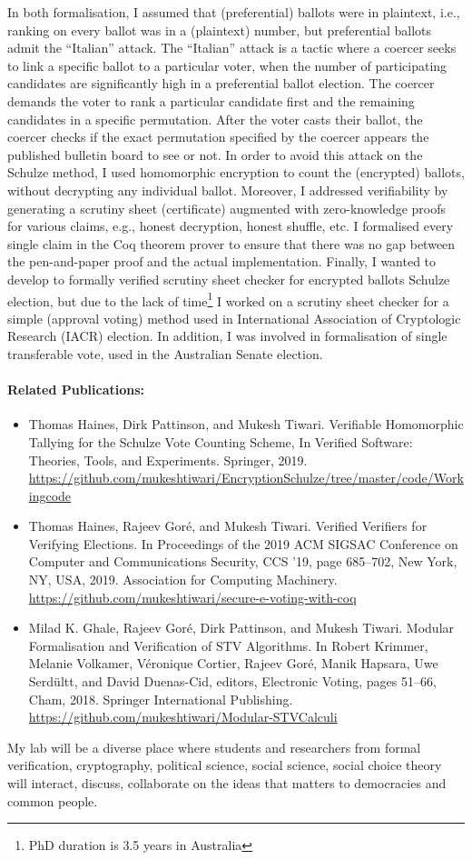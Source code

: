 \documentclass[a4paper]{article}
\begin{document}
In both formalisation, I assumed that (preferential) ballots were in plaintext, i.e., 
ranking on every ballot was in a (plaintext) number, but preferential ballots 
admit the ``Italian'' attack. The ``Italian'' attack is a tactic where a coercer 
seeks to link a specific ballot 
to a particular voter, when the number of participating candidates 
are significantly high in a preferential ballot election. 
The coercer demands the voter to rank a particular 
candidate first and the remaining candidates in a specific permutation. After the 
voter casts their ballot, the coercer checks if 
the exact permutation specified by the coercer appears the published bulletin board to see or not.
In order to
avoid this attack on the Schulze method, I used homomorphic encryption to count the (encrypted) 
ballots, without decrypting any individual ballot. Moreover, I addressed verifiability
by generating a scrutiny sheet (certificate) augmented with zero-knowledge proofs for 
various claims, e.g., honest decryption, honest shuffle, etc. 
I formalised every single 
claim in the Coq theorem prover to ensure that there was no gap between 
the pen-and-paper proof and the actual implementation. 
Finally, I wanted to develop to formally 
verified scrutiny sheet checker for encrypted ballots Schulze election, but due to the lack of 
time\footnote{PhD duration is 3.5 years in Australia} I worked on a scrutiny sheet checker for a 
simple (approval voting) method used in
International Association of Cryptologic Research (IACR) election.
In addition, I was involved in formalisation of single transferable vote, used in 
the Australian Senate election.

\paragraph{Related Publications:}
\begin{itemize}
    \item {Thomas Haines, Dirk Pattinson, and Mukesh Tiwari.} 
    {Verifiable Homomorphic Tallying for the Schulze Vote Counting Scheme, 
    In Verified Software: Theories, Tools, and Experiments. Springer, 2019.}
    {\url{https://github.com/mukeshtiwari/EncryptionSchulze/tree/master/code/Workingcode}}
    \item  {Thomas Haines, Rajeev Gor{\'e}, and Mukesh Tiwari. 
    Verified Verifiers for Verifying Elections. In Proceedings of the 2019 ACM SIGSAC Conference on 
    Computer and Communications Security, CCS '19, page 685--702, New York, NY, 
    USA, 2019. Association for Computing Machinery.}
    {\url{https://github.com/mukeshtiwari/secure-e-voting-with-coq}}
    \item {Milad K. Ghale, Rajeev Gor{\'e}, Dirk Pattinson, and Mukesh Tiwari.
    Modular Formalisation and Verification of STV Algorithms. In Robert Krimmer, Melanie Volkamer, 
    V{\'e}ronique Cortier, 
    Rajeev Gor{\'e}, Manik Hapsara, Uwe Serd{\"u}ltt, and David Duenas-Cid, editors, 
    Electronic Voting, pages 51--66, Cham, 2018. Springer International Publishing.}
    {\url{https://github.com/mukeshtiwari/Modular-STVCalculi}}
\end{itemize}

My lab will be a diverse place where students and researchers from formal 
verification, cryptography, 
political science, social science, social choice theory will interact, discuss, 
collaborate on the ideas that matters to democracies and common people. 
\end{document}
